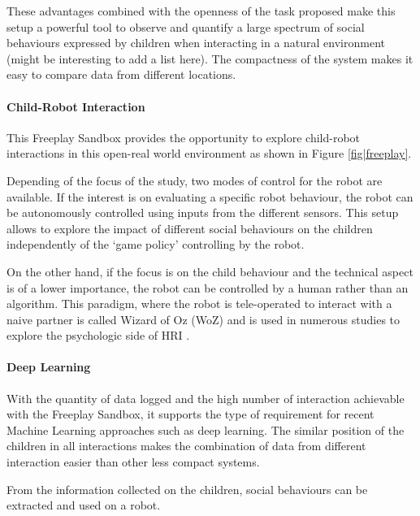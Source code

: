 \documentclass[sigconf]{acmart}
\begin{document}
These advantages combined with the openness of the task proposed make this setup a powerful tool to observe and quantify a large spectrum of social behaviours expressed by children when interacting in a natural environment (might be interesting to add a list here). The compactness of the system makes it easy to compare data from different locations.

\paragraph{Child-Robot Interaction}
\label{ssec|CRI}
This Freeplay Sandbox provides the opportunity to explore child-robot
interactions in this open-real world environment as shown in Figure
\ref{fig|freeplay}. 

Depending of the focus of the study, two modes of control for the robot are
available. If the interest is on evaluating a specific robot behaviour, the
robot can be autonomously controlled using inputs from the different sensors.
This setup allows to explore the impact of different social behaviours on the
children independently of the `game policy' controlling by the robot. 

On the other hand, if the focus is on the child behaviour and the technical
aspect is of a lower importance, the robot can be controlled by a human rather
than an algorithm. This paradigm, where the robot is tele-operated to interact
with a naive partner is called Wizard of Oz (WoZ) and is used in numerous
studies to explore the psychologic side of HRI \cite{riek2012wizard}. 

\paragraph{Deep Learning}

With the quantity of data logged and the high number of interaction achievable with the Freeplay Sandbox, it supports the type of requirement for recent Machine Learning approaches such as deep learning. The similar position of the children in all interactions makes the combination of data from different interaction easier than other less compact systems.

From the information collected on the children, social behaviours can be extracted and used on a robot.

\end{document}
